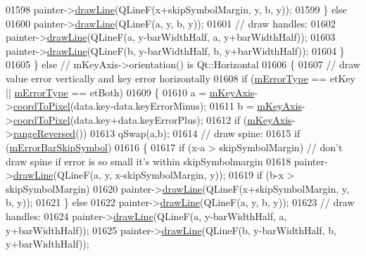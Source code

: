 \begin{DoxyCode}
01598           painter->\hyperlink{a00047_a0b4b1b9bd495e182c731774dc800e6e0}{drawLine}(QLineF(x+skipSymbolMargin, y, b, y));
01599       \} \textcolor{keywordflow}{else}
01600         painter->\hyperlink{a00047_a0b4b1b9bd495e182c731774dc800e6e0}{drawLine}(QLineF(a, y, b, y));
01601       \textcolor{comment}{// draw handles:}
01602       painter->\hyperlink{a00047_a0b4b1b9bd495e182c731774dc800e6e0}{drawLine}(QLineF(a, y-barWidthHalf, a, y+barWidthHalf));
01603       painter->\hyperlink{a00047_a0b4b1b9bd495e182c731774dc800e6e0}{drawLine}(QLineF(b, y-barWidthHalf, b, y+barWidthHalf));
01604     \}
01605   \} \textcolor{keywordflow}{else} \textcolor{comment}{// mKeyAxis->orientation() is Qt::Horizontal}
01606   \{
01607     \textcolor{comment}{// draw value error vertically and key error horizontally}
01608     \textcolor{keywordflow}{if} (\hyperlink{a00031_a29e64273db201aeadebc61c870720a36}{mErrorType} == etKey || \hyperlink{a00031_a29e64273db201aeadebc61c870720a36}{mErrorType} == etBoth)
01609     \{
01610       a = \hyperlink{a00024_a692421b963472fa6e16156a74ba96832}{mKeyAxis}->\hyperlink{a00025_a985ae693b842fb0422b4390fe36d299a}{coordToPixel}(data.key-data.keyErrorMinus);
01611       b = \hyperlink{a00024_a692421b963472fa6e16156a74ba96832}{mKeyAxis}->\hyperlink{a00025_a985ae693b842fb0422b4390fe36d299a}{coordToPixel}(data.key+data.keyErrorPlus);
01612       \textcolor{keywordflow}{if} (\hyperlink{a00024_a692421b963472fa6e16156a74ba96832}{mKeyAxis}->\hyperlink{a00025_ade26dc7994ccd8a11f64fd83377ee021}{rangeReversed}())
01613         qSwap(a,b);
01614       \textcolor{comment}{// draw spine:}
01615       \textcolor{keywordflow}{if} (\hyperlink{a00031_acf631d7dbd1055a69ab3b63094868557}{mErrorBarSkipSymbol})
01616       \{
01617         \textcolor{keywordflow}{if} (x-a > skipSymbolMargin) \textcolor{comment}{// don't draw spine if error is so small it's within skipSymbolmargin}
01618           painter->\hyperlink{a00047_a0b4b1b9bd495e182c731774dc800e6e0}{drawLine}(QLineF(a, y, x-skipSymbolMargin, y));
01619         \textcolor{keywordflow}{if} (b-x > skipSymbolMargin)
01620           painter->\hyperlink{a00047_a0b4b1b9bd495e182c731774dc800e6e0}{drawLine}(QLineF(x+skipSymbolMargin, y, b, y));
01621       \} \textcolor{keywordflow}{else}
01622         painter->\hyperlink{a00047_a0b4b1b9bd495e182c731774dc800e6e0}{drawLine}(QLineF(a, y, b, y));
01623       \textcolor{comment}{// draw handles:}
01624       painter->\hyperlink{a00047_a0b4b1b9bd495e182c731774dc800e6e0}{drawLine}(QLineF(a, y-barWidthHalf, a, y+barWidthHalf));
01625       painter->\hyperlink{a00047_a0b4b1b9bd495e182c731774dc800e6e0}{drawLine}(QLineF(b, y-barWidthHalf, b, y+barWidthHalf));

\end{DoxyCode}
